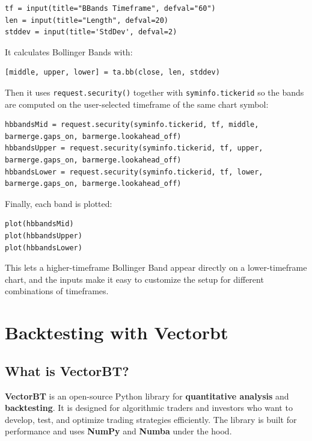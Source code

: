 \documentclass[12pt,openany]{book}
\begin{document}
\begin{Verbatim}[breaklines=true,breakanywhere=true,fontsize=\small]
tf = input(title="BBands Timeframe", defval="60")
len = input(title="Length", defval=20)
stddev = input(title='StdDev', defval=2)
\end{Verbatim}

It calculates Bollinger Bands with:

\begin{Verbatim}[breaklines=true,breakanywhere=true,fontsize=\small]
[middle, upper, lower] = ta.bb(close, len, stddev)
\end{Verbatim}

Then it uses \texttt{request.security()} together with \texttt{syminfo.tickerid} so the bands are computed on the user-selected timeframe of the same chart symbol:

\begin{Verbatim}[breaklines=true,breakanywhere=true,fontsize=\small]
hbbandsMid = request.security(syminfo.tickerid, tf, middle, barmerge.gaps_on, barmerge.lookahead_off)
hbbandsUpper = request.security(syminfo.tickerid, tf, upper, barmerge.gaps_on, barmerge.lookahead_off)
hbbandsLower = request.security(syminfo.tickerid, tf, lower, barmerge.gaps_on, barmerge.lookahead_off)
\end{Verbatim}

Finally, each band is plotted:

\begin{Verbatim}[breaklines=true,breakanywhere=true,fontsize=\small]
plot(hbbandsMid)
plot(hbbandsUpper)
plot(hbbandsLower)
\end{Verbatim}

This lets a higher-timeframe Bollinger Band appear directly on a lower-timeframe chart, and the inputs make it easy to customize the setup for different combinations of timeframes.

\section{Backtesting with Vectorbt}

\subsection{What is VectorBT?}

\textbf{VectorBT} is an open-source Python library for \textbf{quantitative analysis} and \textbf{backtesting}. It is designed for algorithmic traders and investors who want to develop, test, and optimize trading strategies efficiently. The library is built for performance and uses \textbf{NumPy} and \textbf{Numba} under the hood.
\end{document}

